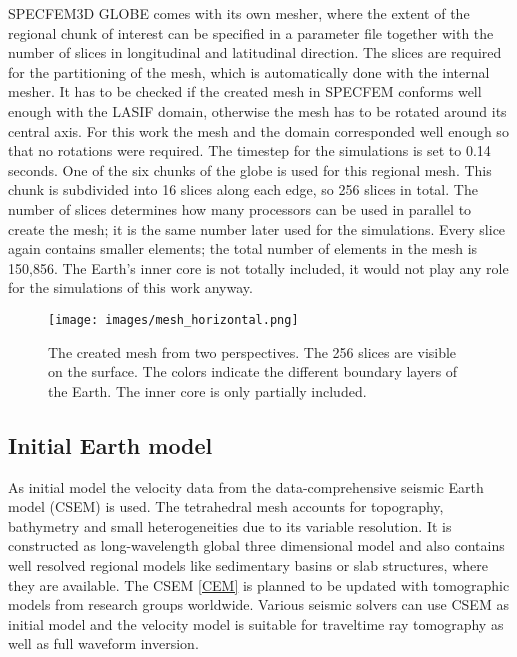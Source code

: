 SPECFEM3D GLOBE comes with its own mesher, where the extent of the regional chunk of interest can be 
specified in a parameter file together with the number of slices in longitudinal and latitudinal direction.
The slices are required for the partitioning of the mesh, which is automatically done with the internal mesher.
It has to be checked if the created mesh in SPECFEM conforms well enough with the LASIF domain, 
otherwise the mesh has to be rotated around its central axis.
For this work the mesh and the domain corresponded well enough so that no rotations were required.
The timestep for the simulations is set to 0.14$\,$seconds.  
One of the six chunks of the globe is used for this regional mesh.
This chunk is subdivided into 16 slices along each edge, so 256 slices in total.
The number of slices determines how many processors can
be used in parallel to create the mesh; 
it is the same number later used for the simulations. 
Every slice again contains smaller elements; the total number of elements in the mesh 
is 150,856. The Earth's inner core is not totally included, it would not play any role
for the simulations of this work anyway.

\begin{figure}[h]
\begin{center}
\texttt{[image: images/mesh\_horizontal.png]}
\caption[Overview of the mesh.]{The created mesh from two perspectives. The 256 slices are visible on the surface.
The colors indicate the different boundary layers of the Earth. The inner core is only partially
included. }
\label{mesh}
\end{center}
\end{figure}


\subsection{Initial Earth model}

As initial model the velocity data from the data-comprehensive seismic Earth model (CSEM) \citep{Afanasiev2014} is used.
The tetrahedral mesh accounts for topography, bathymetry and small heterogeneities due to its variable resolution.
It is constructed as long-wavelength global three dimensional model and also contains well resolved regional models
like sedimentary basins or slab structures, where they are available.
The CSEM \autoref{CEM} is planned to be updated with tomographic models from research groups worldwide.
Various seismic solvers can use CSEM as initial model and the velocity model is suitable for traveltime ray tomography as well as
full waveform inversion.

